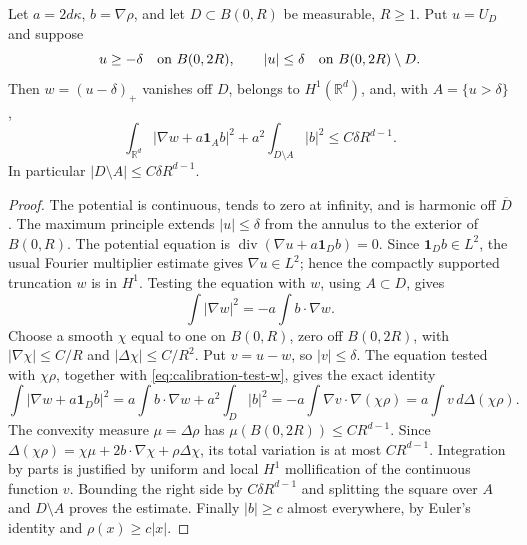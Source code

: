 \begin{lemma}\label{lem:finite-calibration}
Let $a=2d\kappa$, $b=\nabla\rho$, and let $D\subset B(0,R)$ be measurable,
$R\geq1$. Put $u=U_D$ and suppose
\[
 u\geq-\delta\quad\hbox{on }B(0,2R),\qquad
 |u|\leq\delta\quad\hbox{on }B(0,2R)\setminus D.
\]
Then $w=(u-\delta)_+$ vanishes off $D$, belongs to $H^1(\mathbb R^d)$,
and, with $A=\{u>\delta\}$,
\begin{equation}\label{eq:finite-calibration}
 \int_{\mathbb R^d}|\nabla w+a\mathbf1_A b|^2
 +a^2\int_{D\setminus A}|b|^2
 \leq C\delta R^{d-1}.
\end{equation}
In particular $|D\setminus A|\leq C\delta R^{d-1}$.
\end{lemma}
\begin{proof}
The potential is continuous, tends to zero at infinity, and is harmonic
off $\overline D$. The maximum principle extends $|u|\leq\delta$ from the
annulus to the exterior of $B(0,R)$. The potential equation is
$\operatorname{div}(\nabla u+a\mathbf1_D b)=0$.
Since $\mathbf1_D b\in L^2$, the usual Fourier multiplier estimate gives
$\nabla u\in L^2$; hence the compactly supported truncation $w$ is in $H^1$.
Testing the equation with $w$, using $A\subset D$, gives
\begin{equation}\label{eq:calibration-test-w}
 \int|\nabla w|^2=-a\int b\cdot\nabla w.
\end{equation}
Choose a smooth $\chi$ equal to one on $B(0,R)$, zero off $B(0,2R)$,
with $|\nabla\chi|\leq C/R$ and $|\Delta\chi|\leq C/R^2$.
Put $v=u-w$, so $|v|\leq\delta$. The equation tested with $\chi\rho$,
together with \eqref{eq:calibration-test-w}, gives the exact identity
\[
 \int|\nabla w+a\mathbf1_D b|^2
 =a\int b\cdot\nabla w+a^2\int_D|b|^2
 =-a\int\nabla v\cdot\nabla(\chi\rho)
 =a\int v\,d\Delta(\chi\rho).
\]
The convexity measure $\mu=\Delta\rho$ has
$\mu(B(0,2R))\leq CR^{d-1}$. Since
$\Delta(\chi\rho)=\chi\mu+2b\cdot\nabla\chi+\rho\Delta\chi$,
its total variation is at most $CR^{d-1}$. Integration by parts is
justified by uniform and local $H^1$ mollification of the continuous
function $v$. Bounding the right side by $C\delta R^{d-1}$ and splitting
the square over $A$ and $D\setminus A$ proves the estimate.
Finally $|b|\geq c$ almost everywhere, by Euler's identity and
$\rho(x)\geq c|x|$.
\end{proof}

